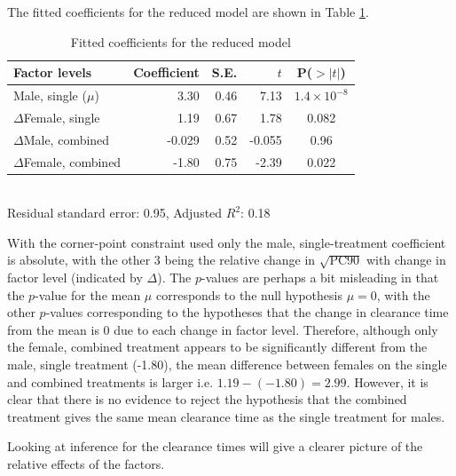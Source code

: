 The fitted coefficients for the reduced model are shown in Table \ref{coefreduced}.
\begin{table}[h]
\centering
\caption{Fitted coefficients for the reduced model}\label{coefreduced}
\begin{tabular}{l|rrrc}
Factor levels&Coefficient&S.E.&$t$&P($>|t|$)\\
\hline
Male, single ($\mu$)			& 3.30 & 0.46 & 7.13 &  $1.4\times 10^{-8}$ \\
$\Delta$Female, single		& 1.19 & 0.67 & 1.78 & 0.082  \\
$\Delta$Male, combined 		& -0.029 & 0.52 & -0.055 & 0.96  \\
$\Delta$Female, combined	& -1.80 & 0.75 & -2.39 & 0.022  \\
\hline
\end{tabular}\\
Residual standard error: 0.95, Adjusted $R^{2}$: 0.18
\end{table}

With the corner-point constraint used only the male, single-treatment coefficient is absolute, with the other 3 being the relative change in $\sqrt{\mathrm{PC}90}$ with change in factor level (indicated by $\Delta$). The $p$-values are perhaps a bit misleading in that the $p$-value for the mean $\mu$ corresponds to the null hypothesis $\mu=0$, with the other $p$-values corresponding to the hypotheses that the change in clearance time from the mean is 0 due to each change in factor level. Therefore, although only the female, combined treatment appears to be significantly different from the male, single treatment (-1.80), the mean difference between females on the single and combined treatments is larger i.e. $1.19-(-1.80)=2.99$. However, it is clear that there is no evidence to reject the hypothesis that the combined treatment gives the same mean clearance time as the single treatment for males.

Looking at inference for the clearance times will give a clearer picture of the relative effects of the factors.

